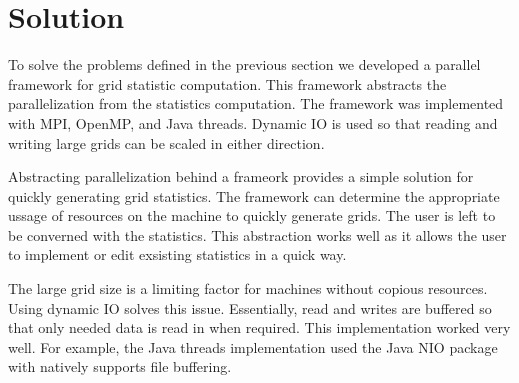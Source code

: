 \section{Solution}
To solve the problems defined in the previous section we developed a parallel framework for grid statistic computation.
This framework abstracts the parallelization from the statistics computation. 
The framework was implemented with MPI, OpenMP, and Java threads.
Dynamic IO is used so that reading and writing large grids can be scaled in either direction.

\par 
Abstracting parallelization behind a frameork provides a simple solution for quickly generating grid statistics.
The framework can determine the appropriate ussage of resources on the machine to quickly generate grids.
The user is left to be converned with the statistics.
This abstraction works well as it allows the user to implement or edit exsisting statistics in a quick way.

\par
The large grid size is a limiting factor for machines without copious resources.
Using dynamic IO solves this issue.
Essentially, read and writes are buffered so that only needed data is read in when required.
This implementation worked very well. 
For example, the Java threads implementation used the Java NIO package with natively supports file buffering.